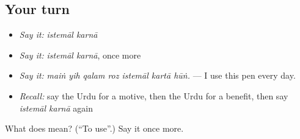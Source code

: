 \subsection*{Your turn}
\begin{itemize}
\raggedright
  \item \emph{Say it:} \emph{istemāl karnā}
  \item \emph{Say it:} \emph{istemāl karnā}, once more
  \item \emph{Say it:} \emph{maiṅ yih qalam roz istemāl kartā hūṅ.} — I use this pen every day.
  \item \emph{Recall:} say the Urdu for a motive, then the Urdu for a benefit, then say \emph{istemāl karnā} again
\end{itemize}

\begin{tcolorbox}[breakable,colback=teal!4,colframe=teal!35!black,title={Before you move on}]
What does   mean? (\textquotedblleft{}To use\textquotedblright{}.) Say it once more.
\end{tcolorbox}
